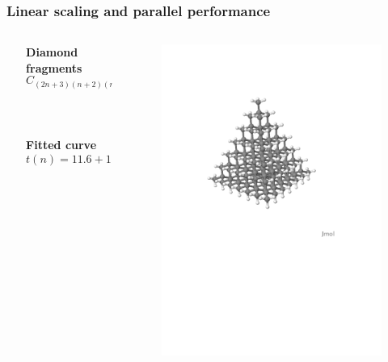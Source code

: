 \begin{frame}
    \frametitle{Linear scaling and parallel performance}
    \begin{columns}
    \begin{column}{.10\textwidth}
    \ \\
    \end{column}
    \begin{column}{.40\textwidth}
    \centering
    \textbf{Diamond fragments}
    \begin{equation}
	\nonumber
	C_{(2n+3)(n+2)(n+1)/6}H_{2(n+2)(n+1)}
    \end{equation}
    \ \\
    \ \\
    \ \\
    \textbf{Fitted curve}
    \begin{equation}
	\nonumber
	t(n) = 11.6 + 1.84n^{0.805}
    \end{equation}
    \end{column}
    \begin{column}{.50\textwidth}
	\begin{figure}
	    \includegraphics[scale=0.25, clip, viewport = 10 390 500 720]{figures/diamond.pdf}

\end{figure}
\end{column}
\end{columns}
\end{frame}
